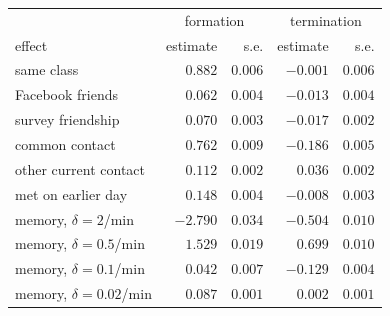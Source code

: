 \begin{ruledtabular}
\begin{tabular}{lrrrr}
 & \multicolumn{2}{c}{formation} & \multicolumn{2}{c}{termination} \\
effect & estimate & s.e. & estimate & s.e. \\
\colrule
same class & $0.882$ & $0.006$ & $-0.001$ & $0.006$ \\
Facebook friends & $0.062$ & $0.004$ & $-0.013$ & $0.004$ \\
survey friendship & $0.070$ & $0.003$ & $-0.017$ & $0.002$ \\
common contact & $0.762$ & $0.009$ & $-0.186$ & $0.005$ \\
other current contact & $0.112$ & $0.002$ & $0.036$ & $0.002$ \\
met on earlier day & $0.148$ & $0.004$ & $-0.008$ & $0.003$ \\
memory, $\delta = 2$/min & $-2.790$ & $0.034$ & $-0.504$ & $0.010$ \\
memory, $\delta = 0.5$/min & $1.529$ & $0.019$ & $0.699$ & $0.010$ \\
memory, $\delta = 0.1$/min & $0.042$ & $0.007$ & $-0.129$ & $0.004$ \\
memory, $\delta = 0.02$/min & $0.087$ & $0.001$ & $0.002$ & $0.001$ \\
\end{tabular}
\end{ruledtabular}
